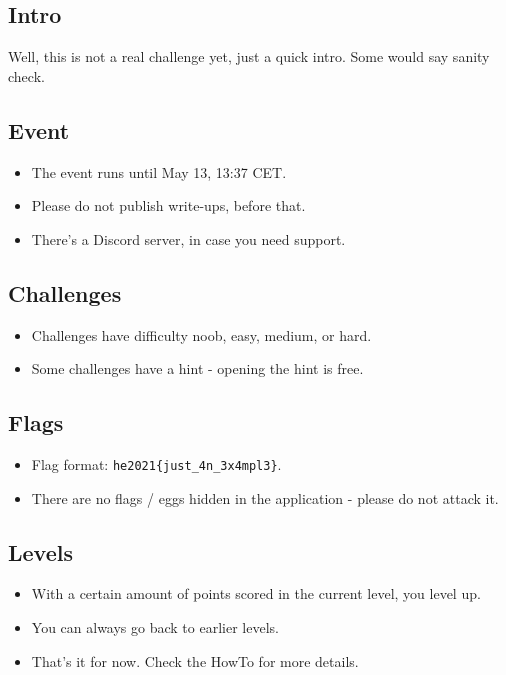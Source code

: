 \documentclass[english,a4paper,nols,noindent]{tufte-handout}
\begin{document}
\subsection{Intro}
Well, this is not a real challenge yet, just a quick intro. Some would say sanity check.

\subsection{Event}

\begin{itemize}
  \item The event runs until May 13, 13:37 CET.
  \item Please do not publish write-ups, before that.
  \item There's a Discord server, in case you need support.
\end{itemize}

\subsection{Challenges}

\begin{itemize}
  \item Challenges have difficulty noob, easy, medium, or hard.
  \item Some challenges have a hint - opening the hint is free.
\end{itemize}

\subsection{Flags}

\begin{itemize}
  \item Flag format: \verb+he2021{just_4n_3x4mpl3}+.
  \item There are no flags / eggs hidden in the application - please do not attack it.
\end{itemize}

\subsection{Levels}

\begin{itemize}
  \item With a certain amount of points scored in the current level, you level up.
  \item You can always go back to earlier levels.
  \item That's it for now. Check the HowTo for more details.
\end{itemize}
\end{document}
